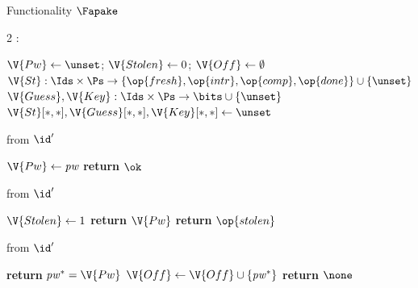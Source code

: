 \begin{interface}[nofloat]{Functionality $\Fapake$ \\
}

{\scriptsize
\setlength{\columnsep}{1.4em}
\begin{multicols}{2}
:
\begin{algorithmic}[1]
\setcounter{contline}{0}\algcont
\State $\V{Pw} \gets \unset$; \quad $\V{Stolen} \gets 0$; \quad $\V{Off} \gets \emptyset$
\State $\V{St} : \Ids \times \Ps \to \{\op{fresh}, \op{intr}, \op{comp}, \op{done}\} \cup \{\unset\}$
\State $\V{Guess}, \V{Key} : \Ids \times \Ps \to \bits \cup \{\unset\}$
\State $\V{St}[*,*], \V{Guess}[*,*], \V{Key}[*,*] \gets \unset$
\algsave
\end{algorithmic}
\vspace{1.4ex}

 \quad from $\id'$
\begin{algorithmic}[1]
\algcont
{} \label{ln:apakereg}
\State $\V{Pw} \gets \mathit{pw}$
\State \textbf{return} $\ok$
\algsave
\end{algorithmic}
\vspace{1.4ex}

 \quad from $\id'$
\begin{algorithmic}[1]
\algcont
{}
\State $\V{Stolen} \gets 1$
 \label{ln:apakeprecomp}
  \State \textbf{return} $\V{Pw}$
\EndIf
\State \textbf{return} $\op{stolen}$
\algsave
\end{algorithmic}
\vspace{1.4ex}

 \quad from $\id'$
\begin{algorithmic}[1]
\algcont
{}
  \State \textbf{return} $\mathit{pw}^{*} = \V{Pw}$ \label{ln:apakeoffline}
\EndIf
\State $\V{Off} \gets \V{Off} \cup \{\mathit{pw}^{*}\}$ \label{ln:apakeprecord}
\State \textbf{return} $\none$
\algsave
\end{algorithmic}
\vspace{1.4ex}


\end{multicols}}
\end{interface}

